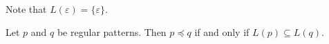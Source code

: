 Note that $L(\varepsilon) = \{\varepsilon\}$.

\begin{lem}\label{regularPatternEquivalence}
  Let $p$ and $q$ be regular patterns.
  Then $p \preceq q$ if and only if $L(p) \subseteq L(q)$.
\end{lem}


